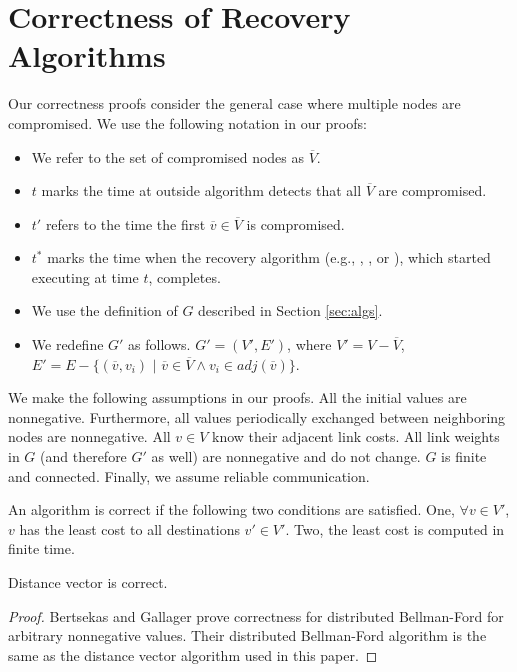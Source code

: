 \section{Correctness of Recovery Algorithms}
\label{sec:correct}

Our correctness proofs consider the general case where multiple nodes are compromised. We use the following notation in our proofs:
\begin{itemize}
	\item We refer to the set of compromised nodes as $\overline{V}$. 
	\item $t$ marks the time at outside algorithm detects that all $\overline{V}$ are compromised. 
	\item $t'$ refers to the time the first $\overline{v} \in \overline{V}$ is compromised. 
	\item $t^*$ marks the time when the recovery algorithm (e.g., \seconds, \purges, or \cprs), which started executing at time $t$, completes.
	\item We use the definition of $G$ described in Section \ref{sec:algs}.
	\item We redefine $G'$ as follows. $G'=(V',E')$, where $V' = V - \overline{V}$, $E'=E - \{(\overline{v},v_i)$ $|$ $\overline{v} \in \overline{V} \wedge v_i \in adj(\overline{v}) \}$.
\end{itemize}

We make the following assumptions in our proofs. All the initial \dmatrix values are nonnegative. Furthermore, all \minv values periodically
exchanged between neighboring nodes are nonnegative. 
All $v \in V$ know their adjacent link costs. All link weights in $G$ (and therefore $G'$ as well) are nonnegative and do not change.
$G$ is finite and connected. Finally, we assume reliable communication. 

\begin{define} 
An algorithm is correct if the following two conditions are satisfied. One, $\forall v \in V'$, $v$ has the least cost to all destinations $v' \in V'$.
Two, the least cost is computed in finite time.
\end{define}


\begin{theorem}
\label{thm:dv-correct}
Distance vector is correct.
\end{theorem}
\begin{proof}
Bertsekas and Gallager \cite{Gall87} prove correctness for distributed Bellman-Ford for arbitrary nonnegative \dmatrix values. 
Their distributed Bellman-Ford algorithm is the same as the distance vector algorithm used in this paper. 
\end{proof}

